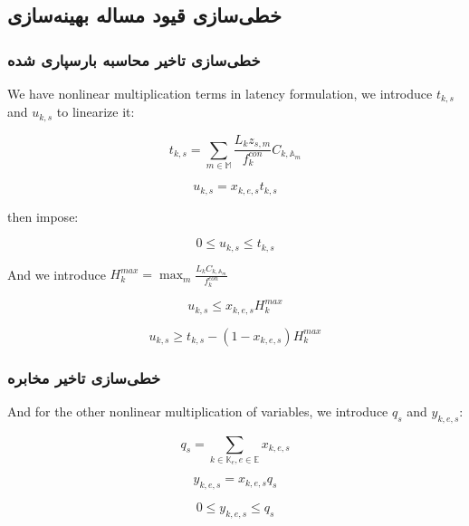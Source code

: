 \subsection{خطی‌سازی قیود مساله بهینه‌سازی}

\subsubsection{خطی‌سازی تاخیر محاسبه بارسپاری شده}
We have nonlinear multiplication terms in latency formulation, we introduce $t_{k,s}$ and $u_{k,s}$ to linearize it:

\begin{equation}
    t_{k,s} = \sum_{m \in \mathbb{M}}\frac{L_k z_{s,m}}{f^{con}_k} C_{k,\mathbb{A}_m}
\end{equation}

\begin{equation}
    u_{k,s} = x_{k,e,s} t_{k,s}
\end{equation}

then impose:

\begin{equation}
    0 \leq u_{k,s} \leq t_{k,s}
\end{equation}

And we introduce $H^{max}_k = \max_m \frac{L_k C_{k,\mathbb{A}_m}}{f^{con}_k}$

\begin{equation}
    u_{k,s} \leq x_{k,e,s} H^{max}_k
\end{equation}

\begin{equation}
    u_{k,s} \geq t_{k,s} - (1-x_{k,e,s}) H^{max}_k
\end{equation}

\subsubsection{خطی‌سازی تاخیر مخابره}

And for the other nonlinear multiplication of variables, we introduce $q_s$ and $y_{k,e,s}$:

\begin{equation}
    q_s = \sum_{k \in \mathbb{K}_e, e \in \mathbb{E}} x_{k,e,s}
\end{equation}

\begin{equation}
    y_{k,e,s} = x_{k,e,s} q_s
\end{equation}

\begin{equation}
    0 \leq y_{k,e,s} \leq q_s
\end{equation}

